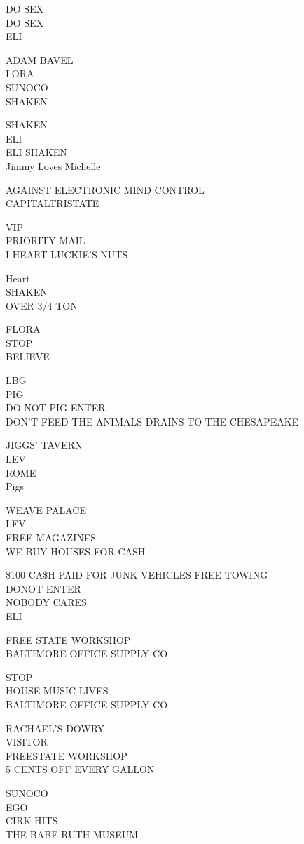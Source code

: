 \documentclass[10pt,letterpaper]{article}
\begin{document}
DO SEX\\
DO SEX\\
ELI

ADAM BAVEL\\
LORA\\
SUNOCO\\
SHAKEN

SHAKEN\\
ELI\\
ELI SHAKEN\\
Jimmy Loves Michelle

AGAINST ELECTRONIC MIND CONTROL\\
CAPITALTRISTATE

VIP\\
PRIORITY MAIL\\
I HEART LUCKIE'S NUTS

Heart\\
SHAKEN\\
OVER 3/4 TON

FLORA\\
STOP\\
BELIEVE

LBG\\
PIG\\
DO NOT PIG ENTER\\
DON'T FEED THE ANIMALS DRAINS TO THE CHESAPEAKE

JIGGS' TAVERN\\
LEV\\
ROME\\
Pigs

WEAVE PALACE\\
LEV\\
FREE MAGAZINES\\
WE BUY HOUSES FOR CASH

\$100 CA\$H PAID FOR JUNK VEHICLES FREE TOWING\\
DONOT ENTER\\
NOBODY CARES\\
ELI

FREE STATE WORKSHOP\\
BALTIMORE OFFICE SUPPLY CO

STOP\\
HOUSE MUSIC LIVES\\
BALTIMORE OFFICE SUPPLY CO

RACHAEL'S DOWRY\\
VISITOR\\
FREESTATE WORKSHOP\\
5 CENTS OFF EVERY GALLON

SUNOCO\\
EGO\\
CIRK HITS\\
THE BABE RUTH MUSEUM
\end{document}
